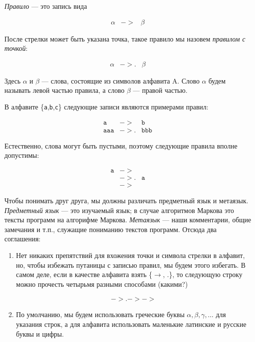 \documentclass[12pt,a4paper,oneside]{article}
\newcommand{\s}[1]{\texttt{#1}}
\begin{document}
\begin{definition}\emph{Правило} --- это запись вида 
\begin{bnf}\begin{eqnarray*}\alpha &->& \beta \end{eqnarray*}\end{bnf}После
стрелки может быть указана точка, такое правило мы назовем 
\emph{правилом с точкой}:
\begin{bnf}\begin{eqnarray*}\alpha &->.& \beta \end{eqnarray*}\end{bnf}Здесь 
$\alpha$ и $\beta$ --- слова, состоящие из символов алфавита A. 
Слово $\alpha$ будем называть левой частью правила, а слово $\beta$ --- правой частью.
\end{definition}

\begin{example}В алфавите \{\s{a},\s{b},\s{c}\} следующие записи являются примерами правил: 
\begin{bnf}\begin{eqnarray*}
  \s{a} &->& \s{b}\\
  \s{aaa} &->.& \s{bbb}
\end{eqnarray*}
\end{bnf}Естественно, слова могут быть пустыми, поэтому следующие правила вполне допустимы:
\begin{bnf}\begin{eqnarray*}
 \s{a} &->&\\
 &->.& \s{a}\\
 &->&
\end{eqnarray*}\end{bnf}  
\end{example}

Чтобы понимать друг друга, мы должны различать предметный язык и метаязык. \emph{Предметный язык} --- это
изучаемый язык; в случае алгоритмов Маркова это тексты программ на алгорифме Маркова.
\emph{Метаязык} --- наши комментарии, общие замечания и т.п., служащие пониманию текстов программ.
Отсюда два соглашения:

\begin{enumerate}
\item Нет никаких препятствий для вхожения точки и символа стрелки
в алфавит, но, чтобы избежать путаницы с записью правил, мы будем этого
избегать. В самом деле, если в качестве алфавита взять \{$\longrightarrow$, .\}, 
то следующую строку можно прочесть четырьмя разными способами (какими?)
\begin{bnf}\begin{eqnarray*}
->.->->
\end{eqnarray*}\end{bnf}

\item По умолчанию, мы будем использовать греческие буквы $\alpha,\beta,\gamma,\dots$ для
указания строк, а для алфавита использовать маленькие латинские и русские буквы и цифры.
\end{enumerate}
\end{document}
